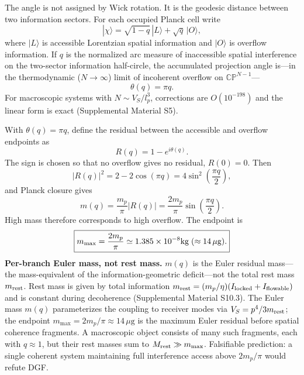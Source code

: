 \documentclass[aps,prl,twocolumn,superscriptaddress,nofootinbib,floatfix]{revtex4-2}
\begin{document}
The angle is not assigned by Wick rotation. It is the geodesic distance between two information sectors. For each occupied Planck cell write
\begin{equation}
|\chi\rangle
=\sqrt{1-q}\,|L\rangle+\sqrt{q}\,|O\rangle,
\end{equation}
where $|L\rangle$ is accessible Lorentzian spatial information and $|O\rangle$ is overflow information. If $q$ is the normalized arc measure of inaccessible spatial interference on the two-sector information half-circle, the accumulated projection angle is---in the thermodynamic ($N\to\infty$) limit of incoherent overflow on $\mathbb{CP}^{N-1}$---
\begin{equation}
\boxed{\theta(q)=\pi q.}
\end{equation}
For macroscopic systems with $N\sim V_S/l_p^3$, corrections are $O(10^{-198})$ and the linear form is exact (Supplemental Material S5).

With $\theta(q)=\pi q$, define the residual between the accessible and overflow endpoints as
\begin{equation}
R(q)=1-e^{i\theta(q)}.
\end{equation}
The sign is chosen so that no overflow gives no residual, $R(0)=0$. Then
\begin{equation}
|R(q)|^2
=2-2\cos(\pi q)
=4\sin^2\left(\frac{\pi q}{2}\right),
\end{equation}
and Planck closure gives
\begin{equation}
\boxed{
m(q)=\frac{m_p}{\pi}|R(q)|
=\frac{2m_p}{\pi}\sin\left(\frac{\pi q}{2}\right).
}
\end{equation}
High mass therefore corresponds to high overflow. The endpoint is
\begin{equation}
\boxed{
m_{\max}=\frac{2m_p}{\pi}\simeq1.385\times10^{-8}{\rm kg}\;(\approx14\,\mu\text{g}).
}
\end{equation}
\textbf{Per-branch Euler mass, not rest mass.} $m(q)$ is the Euler residual mass---the mass-equivalent of the information-geometric deficit---not the total rest mass $m_{\rm rest}$. Rest mass is given by total information $m_{\rm rest}=(m_p/\eta)(I_{\rm locked}+I_{\rm flowable})$ and is constant during decoherence (Supplemental Material S10.3). The Euler mass $m(q)$ parameterizes the coupling to receiver modes via $V_S=p^4/3m_{\rm rest}$; the endpoint $m_{\max}=2m_p/\pi\approx14\,\mu\text{g}$ is the maximum Euler residual before spatial coherence fragments. A macroscopic object consists of many such fragments, each with $q\approx1$, but their rest masses sum to $M_{\rm rest}\gg m_{\max}$. Falsifiable prediction: a single coherent system maintaining full interference access above $2m_p/\pi$ would refute DGF.
\end{document}
